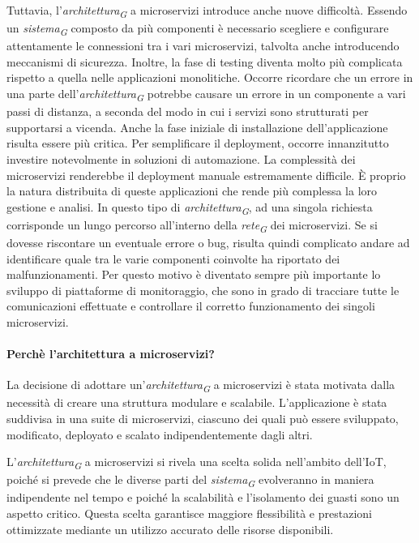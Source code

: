 Tuttavia, l’\textit{architettura}\textsubscript{\textit{G}} a microservizi introduce anche nuove difficoltà. Essendo un \textit{sistema}\textsubscript{\textit{G}} composto da più componenti è necessario scegliere e configurare
attentamente le connessioni tra i vari microservizi, talvolta anche introducendo
meccanismi di sicurezza. Inoltre, la fase di testing diventa molto più complicata
rispetto a quella nelle applicazioni monolitiche. Occorre ricordare che un errore in
una parte dell’\textit{architettura}\textsubscript{\textit{G}} potrebbe causare un errore in un componente a vari
passi di distanza, a seconda del modo in cui i servizi sono strutturati per supportarsi
a vicenda.
Anche la fase iniziale di installazione dell’applicazione risulta essere più critica.
Per semplificare il deployment, occorre innanzitutto investire notevolmente in
soluzioni di automazione. La complessità dei microservizi renderebbe il deployment
manuale estremamente difficile.
È proprio la natura distribuita di queste applicazioni che rende più complessa
la loro gestione e analisi. In questo tipo di \textit{architettura}\textsubscript{\textit{G}}, ad una singola richiesta
corrisponde un lungo percorso all’interno della \textit{rete}\textsubscript{\textit{G}} dei microservizi. Se si dovesse
riscontare un eventuale errore o bug, risulta quindi complicato andare ad identificare
quale tra le varie componenti coinvolte ha riportato dei malfunzionamenti. Per
questo motivo è diventato sempre più importante lo sviluppo di piattaforme di
monitoraggio, che sono in grado di tracciare tutte le comunicazioni effettuate e
controllare il corretto funzionamento dei singoli microservizi.
\paragraph*{Perchè l'architettura a microservizi?}
La decisione di adottare un'\textit{architettura}\textsubscript{\textit{G}} a microservizi è stata motivata dalla necessità di creare una struttura modulare e scalabile. L'applicazione è stata suddivisa in una suite di microservizi, ciascuno dei quali può essere sviluppato, modificato, deployato e scalato indipendentemente dagli altri.

L'\textit{architettura}\textsubscript{\textit{G}} a microservizi si rivela una scelta solida nell'ambito dell'IoT, poiché si prevede che le diverse parti del \textit{sistema}\textsubscript{\textit{G}} evolveranno in maniera indipendente nel tempo e poiché la scalabilità e l'isolamento dei guasti sono un aspetto critico. Questa scelta garantisce maggiore flessibilità e prestazioni ottimizzate mediante un utilizzo accurato delle risorse disponibili.

